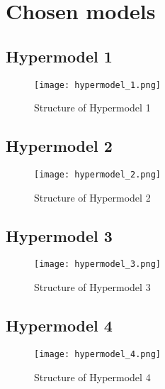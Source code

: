 \section{Chosen models}\label{2_models}
\subsection{Hypermodel 1}
\begin{figure}[h]
    \label{fig:Hypermodel_1}
    \centering
    \texttt{[image: hypermodel\_1.png]}
    \caption{Structure of Hypermodel 1}
\end{figure}
\subsection{Hypermodel 2}\begin{figure}[h]
    \label{fig:Hypermodel_2}
    \centering
    \texttt{[image: hypermodel\_2.png]}
    \caption{Structure of Hypermodel 2}
\end{figure}

\subsection{Hypermodel 3}
\begin{figure}[h]
    \label{fig:Hypermodel_3}
    \centering
    \texttt{[image: hypermodel\_3.png]}
    \caption{Structure of Hypermodel 3}
\end{figure}
\subsection{Hypermodel 4}
\begin{figure}[h]
    \label{fig:Hypermodel_4}
    \centering
    \texttt{[image: hypermodel\_4.png]}
    \caption{Structure of Hypermodel 4}
\end{figure}


